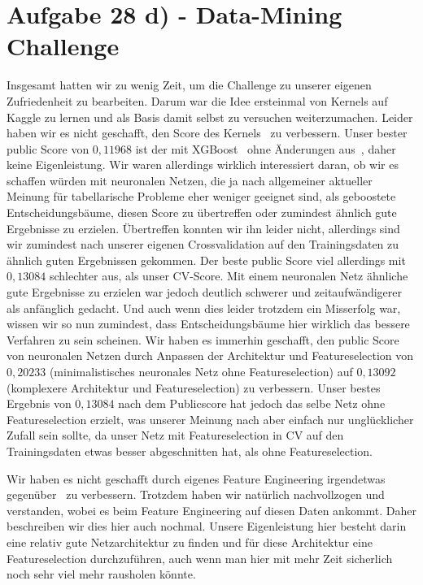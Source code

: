 \documentclass[a4paper, 11pt]{article}
\begin{document}
\section*{Aufgabe 28 d) - Data-Mining Challenge}
Insgesamt hatten wir zu wenig Zeit, um die Challenge zu unserer eigenen Zufriedenheit zu bearbeiten. Darum war die Idee ersteinmal von Kernels auf Kaggle zu lernen und als Basis damit selbst zu versuchen weiterzumachen. Leider haben wir es nicht geschafft, den Score des Kernels~\cite{kernel} zu verbessern. Unser bester public Score von $0,11968$ ist der mit XGBoost~\cite{xgboost} ohne Änderungen aus~\cite{kernel}, daher keine Eigenleistung. Wir waren allerdings wirklich interessiert daran, ob wir es schaffen würden mit neuronalen Netzen, die ja nach allgemeiner aktueller Meinung für tabellarische Probleme eher weniger geeignet sind, als geboostete Entscheidungsbäume, diesen Score zu übertreffen oder zumindest ähnlich gute Ergebnisse zu erzielen. Übertreffen konnten wir ihn leider nicht, allerdings sind wir zumindest nach unserer eigenen Crossvalidation auf den Trainingsdaten zu ähnlich guten Ergebnissen gekommen. Der beste public Score viel allerdings mit $0,13084$ schlechter aus, als unser CV-Score. Mit einem neuronalen Netz ähnliche gute Ergebnisse zu erzielen war jedoch deutlich schwerer und zeitaufwändigerer als anfänglich gedacht. Und auch wenn dies leider trotzdem ein Misserfolg war, wissen wir so nun zumindest, dass Entscheidungsbäume hier wirklich das bessere Verfahren zu sein scheinen. Wir haben es immerhin geschafft, den public Score von neuronalen Netzen durch Anpassen der Architektur und Featureselection von $0,20233$ (minimalistisches neuronales Netz ohne Featureselection) auf $0,13092$ (komplexere Architektur und Featureselection) zu verbessern. Unser bestes Ergebnis von $0,13084$ nach dem Publicscore hat jedoch das selbe Netz ohne Featureselection erzielt, was unserer Meinung nach aber einfach nur unglücklicher Zufall sein sollte, da unser Netz mit Featureselection in CV auf den Trainingsdaten etwas besser abgeschnitten hat, als ohne Featureselection.

Wir haben es nicht geschafft durch eigenes Feature Engineering irgendetwas gegenüber~\cite{kernel} zu verbessern. Trotzdem haben wir natürlich nachvollzogen und verstanden, wobei es beim Feature Engineering auf diesen Daten ankommt. Daher beschreiben wir dies hier auch nochmal. Unsere Eigenleistung hier besteht darin eine relativ gute Netzarchitektur zu finden und für diese Architektur eine Featureselection durchzuführen, auch wenn man hier mit mehr Zeit sicherlich noch sehr viel mehr rausholen könnte.
\end{document}
